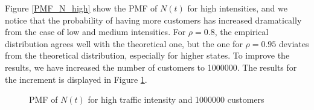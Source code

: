 \documentclass[12pt, a4paper]{article}
\begin{document}
Figure \ref{PMF_N_high} show the PMF of $N(t)$ for high intensities, and we notice that the 
probability of having more customers has increased dramatically from the case of low 
and medium intensities. For $\rho=0.8$, the empirical distribution agrees well with the theoretical
one, but the one for $\rho=0.95$ deviates from the theoretical distribution, especially for higher 
states. To improve the results, we have increased the number of customers to 1000000.
The results for the increment is displayed in Figure \ref{PMF_N_high_more_cust}.

\begin{figure}[H]
  \centering
  \hspace{0px}
  \caption{PMF of $N(t)$  for high traffic intensity and 1000000 customers}  
  \label{PMF_N_high_more_cust}
\end{figure}
\end{document}
